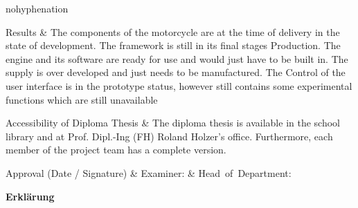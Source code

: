 {\begin{hyphenrules}{nohyphenation}
\begin{center}
			\begin{mytable}
				Results & The components of the motorcycle are at the time of delivery in the state of development. The framework is still in its final stages Production. The engine and its software are ready for use and would just have to be built in. The supply is over developed and just needs to be manufactured. The Control of the user interface is in the prototype status, however still contains some experimental functions which are still unavailable\\
			\end{mytable}\vskip-0.42cm
			\begin{mytable}
				Accessibility of Diploma Thesis & The diploma thesis is available in the school library and at Prof. Dipl.-Ing (FH) Roland Holzer’s office. Furthermore, each member of the project team has a complete version.
				\\
			\end{mytable}\vskip-0.42cm
			\begin{mytable}[{|X[0.995,c]|X[1,m]|X[1,m]|}]
				\hfil Approval \newline \hfil (Date / Signature) &
				\hbox{\footnotesize{Examiner:}} &
				\hbox{\footnotesize{Head of Department:}} \\
				\hline
			\end{mytable}
		\end{center}
	\end{hyphenrules}
}



\newpage
\thispagestyle{empty}
\mbox{}
\newpage


\newpage
\begin{huge}
\textbf{Erklärung}
\end{huge}
\bigskip


